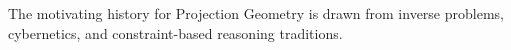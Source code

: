 The motivating history for Projection Geometry is drawn from inverse problems, cybernetics, and constraint-based reasoning traditions.

